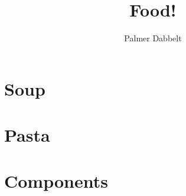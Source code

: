 \documentclass{book}
\author{Palmer Dabbelt}
\title{Food!}
\begin{document}
\maketitle
\tableofcontents
\contentsskip

\newcommand{\maketitle}{}
\renewcommand{\tableofcontents}{}
\newcommand{\author}[1]{}
\newcommand{\title}[1]{}
\renewcommand{\contentsskip}{}
\renewcommand{\bref}[1]{\ref{#1}}

\chapter{Soup}


\chapter{Pasta}


\chapter{Components}

\end{document}

